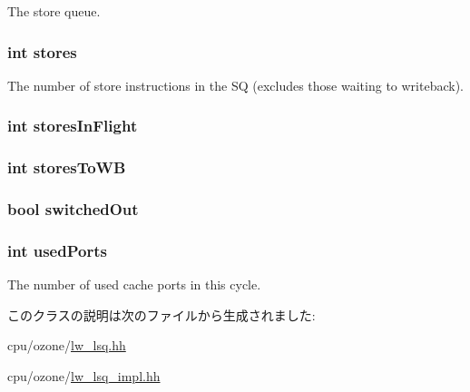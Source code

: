 \label{classOzoneLWLSQ_aadda2adf789b0c8a3eb952ac5d65d4ed}
The store queue. \hypertarget{classOzoneLWLSQ_ade9e895aa9c5ace27779c985c4f43326}{
\subsubsection[{stores}]{\setlength{\rightskip}{0pt plus 5cm}int {\bf stores}}}
\label{classOzoneLWLSQ_ade9e895aa9c5ace27779c985c4f43326}
The number of store instructions in the SQ (excludes those waiting to writeback). \hypertarget{classOzoneLWLSQ_a04638dcfe9b4f8584453bb178bd2da5e}{
\subsubsection[{storesInFlight}]{\setlength{\rightskip}{0pt plus 5cm}int {\bf storesInFlight}}}
\label{classOzoneLWLSQ_a04638dcfe9b4f8584453bb178bd2da5e}
\hypertarget{classOzoneLWLSQ_a3831a7965ffbe90df177026988476f9c}{
\subsubsection[{storesToWB}]{\setlength{\rightskip}{0pt plus 5cm}int {\bf storesToWB}}}
\label{classOzoneLWLSQ_a3831a7965ffbe90df177026988476f9c}
\hypertarget{classOzoneLWLSQ_a1aee6db9bfb75cf02e38a82e5d02847f}{
\subsubsection[{switchedOut}]{\setlength{\rightskip}{0pt plus 5cm}bool {\bf switchedOut}}}
\label{classOzoneLWLSQ_a1aee6db9bfb75cf02e38a82e5d02847f}
\hypertarget{classOzoneLWLSQ_a03435d626b7567ed154de5d7d8c3d419}{
\subsubsection[{usedPorts}]{\setlength{\rightskip}{0pt plus 5cm}int {\bf usedPorts}}}
\label{classOzoneLWLSQ_a03435d626b7567ed154de5d7d8c3d419}
The number of used cache ports in this cycle. 

このクラスの説明は次のファイルから生成されました:\begin{DoxyCompactItemize}
\item 
cpu/ozone/\hyperlink{lw__lsq_8hh}{lw\_\-lsq.hh}\item 
cpu/ozone/\hyperlink{lw__lsq__impl_8hh}{lw\_\-lsq\_\-impl.hh}\end{DoxyCompactItemize}
